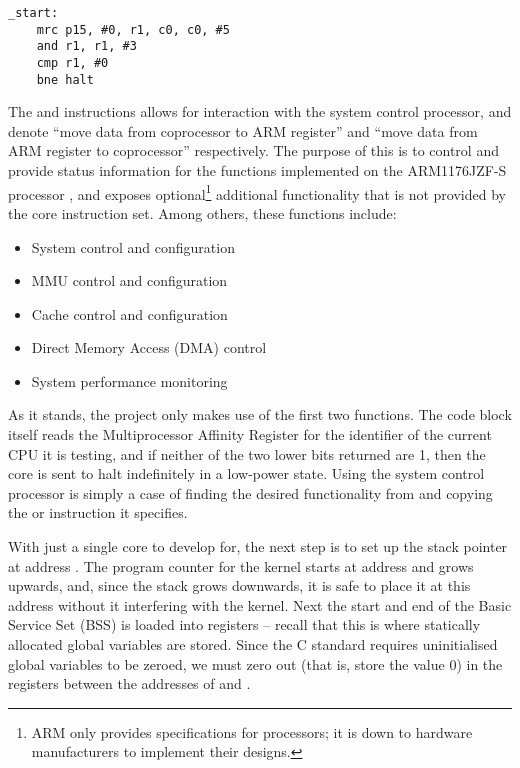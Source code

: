         \lstset{style=asm}
        \begin{lstlisting}[caption={Code to halt three of the four cores},captionpos=b]
_start:
    mrc p15, #0, r1, c0, c0, #5
    and r1, r1, #3
    cmp r1, #0
    bne halt
        \end{lstlisting}

        The  and  instructions allows for interaction with
        the system control processor, and denote ``move data from coprocessor to
        ARM register'' and ``move data from ARM register to coprocessor''
        respectively. The purpose of this is to control and provide status
        information for the functions implemented on the ARM1176JZF-S processor
        \cite[pg.~3-2]{TRM}, and exposes optional\footnote{ARM only provides
        specifications for processors; it is down to hardware manufacturers to
        implement their designs.} additional functionality that is not provided
        by the core instruction set. Among others, these functions include:
        \begin{itemize}
            \itemsep0em
            \item System control and configuration
            \item MMU control and configuration
            \item Cache control and configuration
            \item Direct Memory Access (DMA) control
            \item System performance monitoring
        \end{itemize}

        As it stands, the project only makes use of the first two functions. The
        code block itself reads the Multiprocessor Affinity Register
        \cite{MPIDR} for the identifier of the current CPU it is testing, and if
        neither of the two lower bits returned are 1, then the core is sent to
        halt indefinitely in a low-power state. Using the system control
        processor is simply a case of finding the desired functionality from
        \cite[pg.~3-14]{TRM} and copying the  or 
        instruction it specifies.

        With just a single core to develop for, the next step is to set up the
        stack pointer at address . The program counter for the
        kernel starts at address  and grows upwards, and, since the
        stack grows downwards, it is safe to place it at this address without it
        interfering with the kernel. Next the start and end of the Basic Service
        Set (BSS) is loaded into registers -- recall that this is where
        statically allocated global variables are stored. Since the C standard
        requires uninitialised global variables to be zeroed, we must zero out
        (that is, store the value 0) in the registers between the addresses of
         and .

